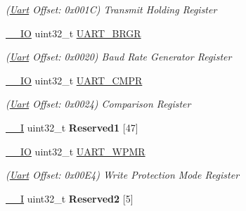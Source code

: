 \begin{DoxyCompactItemize}
\begin{DoxyCompactList}\small\item\em (\mbox{\hyperlink{structUart}{Uart}} Offset\+: 0x001C) Transmit Holding Register \end{DoxyCompactList}\item 
\mbox{\label{structUart_ae5a720941bb1d780ecae834cd16eeaa3}} 
\mbox{\hyperlink{core__cm7_8h_aec43007d9998a0a0e01faede4133d6be}{\+\_\+\+\_\+\+IO}} uint32\+\_\+t \mbox{\hyperlink{structUart_ae5a720941bb1d780ecae834cd16eeaa3}{U\+A\+R\+T\+\_\+\+B\+R\+GR}}
\begin{DoxyCompactList}\small\item\em (\mbox{\hyperlink{structUart}{Uart}} Offset\+: 0x0020) Baud Rate Generator Register \end{DoxyCompactList}\item 
\mbox{\label{structUart_aaa1ac583201b9131aa71534a4c5eb2d5}} 
\mbox{\hyperlink{core__cm7_8h_aec43007d9998a0a0e01faede4133d6be}{\+\_\+\+\_\+\+IO}} uint32\+\_\+t \mbox{\hyperlink{structUart_aaa1ac583201b9131aa71534a4c5eb2d5}{U\+A\+R\+T\+\_\+\+C\+M\+PR}}
\begin{DoxyCompactList}\small\item\em (\mbox{\hyperlink{structUart}{Uart}} Offset\+: 0x0024) Comparison Register \end{DoxyCompactList}\item 
\mbox{\label{structUart_ad60937f3f02d44a00958f7a41c895f99}} 
\mbox{\hyperlink{core__cm7_8h_af63697ed9952cc71e1225efe205f6cd3}{\+\_\+\+\_\+I}} uint32\+\_\+t {\bfseries Reserved1} \mbox{[}47\mbox{]}
\item 
\mbox{\label{structUart_a9d54c286957fd7240e1f51aad22b5f03}} 
\mbox{\hyperlink{core__cm7_8h_aec43007d9998a0a0e01faede4133d6be}{\+\_\+\+\_\+\+IO}} uint32\+\_\+t \mbox{\hyperlink{structUart_a9d54c286957fd7240e1f51aad22b5f03}{U\+A\+R\+T\+\_\+\+W\+P\+MR}}
\begin{DoxyCompactList}\small\item\em (\mbox{\hyperlink{structUart}{Uart}} Offset\+: 0x00\+E4) Write Protection Mode Register \end{DoxyCompactList}\item 
\mbox{\label{structUart_aa9809c660aec99a18daffb692cb9900c}} 
\mbox{\hyperlink{core__cm7_8h_af63697ed9952cc71e1225efe205f6cd3}{\+\_\+\+\_\+I}} uint32\+\_\+t {\bfseries Reserved2} \mbox{[}5\mbox{]}

\end{DoxyCompactItemize}
